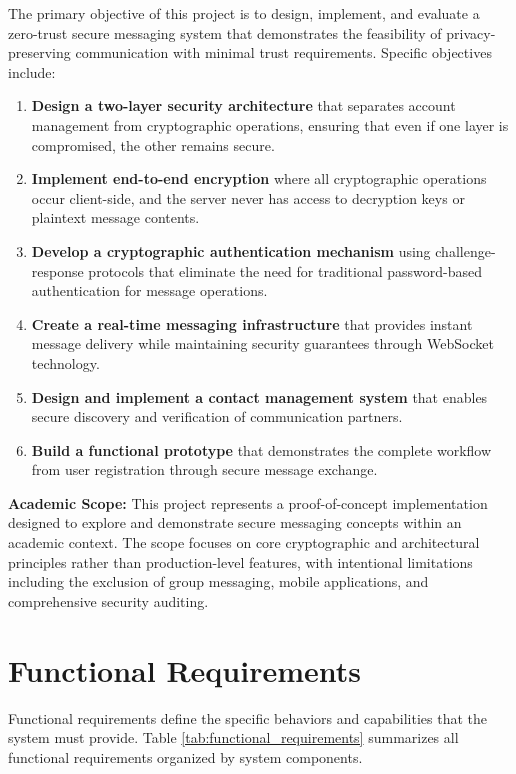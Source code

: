 \documentclass[12pt,a4paper,openany]{book}
\begin{document}
The primary objective of this project is to design, implement, and evaluate a zero-trust secure messaging system that demonstrates the feasibility of privacy-preserving communication with minimal trust requirements. Specific objectives include:

\begin{enumerate}
\item \textbf{Design a two-layer security architecture} that separates account management from cryptographic operations, ensuring that even if one layer is compromised, the other remains secure.
\item \textbf{Implement end-to-end encryption} where all cryptographic operations occur client-side, and the server never has access to decryption keys or plaintext message contents.
\item \textbf{Develop a cryptographic authentication mechanism} using challenge-response protocols that eliminate the need for traditional password-based authentication for message operations.
\item \textbf{Create a real-time messaging infrastructure} that provides instant message delivery while maintaining security guarantees through WebSocket technology.
\item \textbf{Design and implement a contact management system} that enables secure discovery and verification of communication partners.
\item \textbf{Build a functional prototype} that demonstrates the complete workflow from user registration through secure message exchange.
\end{enumerate}

\textbf{Academic Scope:} This project represents a proof-of-concept implementation designed to explore and demonstrate secure messaging concepts within an academic context. The scope focuses on core cryptographic and architectural principles rather than production-level features, with intentional limitations including the exclusion of group messaging, mobile applications, and comprehensive security auditing.

\section{Functional Requirements}

Functional requirements define the specific behaviors and capabilities that the system must provide. Table \ref{tab:functional_requirements} summarizes all functional requirements organized by system components.
\end{document}
